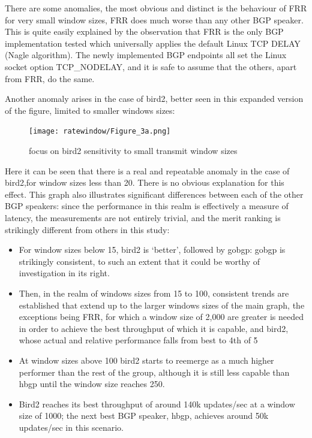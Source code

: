 There are some  anomalies, the most obvious and distinct is the behaviour of FRR \- for very small window sizes, FRR does much worse than any other BGP speaker.
This is quite easily explained by the observation that FRR is the only BGP implementation tested which universally applies the default Linux TCP DELAY (Nagle algorithm).
The newly implemented BGP endpoints all set the Linux socket option TCP\_NODELAY, and it is safe to assume that the others, apart from FRR, do the same.

Another anomaly arises in the case of bird2, better seen in this expanded version of the figure, limited to smaller windows sizes:

\begin{figure}[H]
    \centering
    \texttt{[image: ratewindow/Figure\_3a.png]}
    \caption{focus on bird2 sensitivity to small transmit window sizes }
    \label{fig:rw_fig3a}
\end{figure}

Here it can be seen that there is a real and repeatable anomaly in the case of bird2,for window sizes less than 20.
There is no obvious explanation for this effect.
This graph also illustrates significant differences between each of the other BGP speakers: since the performance in this realm is effectively a measure of latency, the measurements are not entirely trivial, and the merit ranking is strikingly different from others in this study:
\begin{itemize}
     \item For window sizes below 15, bird2 is ‘better’, followed by gobgp: gobgp is strikingly consistent, to such an extent that it could be worthy of investigation in its right.
     \item Then, in the realm of windows sizes from 15 to 100, consistent trends are established that extend up to the larger windows sizes of the main graph, the exceptions being FRR, for which a window size of 2,000 are greater is needed in order to achieve the best throughput of which it is capable, and bird2, whose actual and relative performance falls from best to 4th of 5\.
     \item At window sizes above 100 bird2 starts to reemerge as a much higher performer than the rest of the group, although it is still less capable than hbgp until the window size reaches 250.
     \item Bird2 reaches its best throughput of around 140k updates/sec at a window size of 1000; the next best BGP speaker, hbgp, achieves around 50k updates/sec in this scenario.
\end{itemize}

